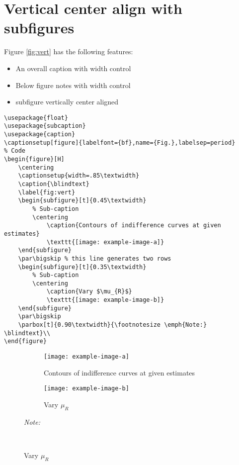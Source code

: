\documentclass[12pt,english]{article}
\begin{document}
\pagebreak


\section{Vertical center align with subfigures}

Figure \ref{fig:vert} has the following features:
\begin{itemize}
    \item An overall caption with width control
    \item Below figure notes with width control
    \item subfigure vertically center aligned
\end{itemize}

\begin{lstlisting}[frame=single]
% Included Package
\usepackage{float}
\usepackage{subcaption}
\usepackage{caption}
\captionsetup[figure]{labelfont={bf},name={Fig.},labelsep=period}
% Code
\begin{figure}[H]
    \centering
    \captionsetup{width=.85\textwidth}
	\caption{\blindtext}
	\label{fig:vert}
	\begin{subfigure}[t]{0.45\textwidth}
        % Sub-caption
        \centering
    		\caption{Contours of indifference curves at given estimates}
    		\texttt{[image: example-image-a]}
	\end{subfigure}
	\par\bigskip % this line generates two rows
	\begin{subfigure}[t]{0.35\textwidth}
	    % Sub-caption
	    \centering
    		\caption{Vary $\mu_{R}$}
    		\texttt{[image: example-image-b]}
	\end{subfigure}
	\par\bigskip
    \parbox[t]{0.90\textwidth}{\footnotesize \emph{Note:} \blindtext}\\
\end{figure}
\end{lstlisting}

\par\medskip
\begin{figure}[H]
    \centering
    \captionsetup{width=.85\textwidth}
	\caption{\blindtext}
	\label{fig:vert}
	\begin{subfigure}[t]{0.45\textwidth}
        \centering
    		\caption{Contours of indifference curves at given estimates}
    		\texttt{[image: example-image-a]}
	\end{subfigure}
	\par\bigskip %
	\begin{subfigure}[t]{0.35\textwidth}
	    \centering
    		\caption{Vary $\mu_{R}$}
    		\texttt{[image: example-image-b]}
	\end{subfigure}
	\par\bigskip
    \parbox[t]{0.90\textwidth}{\footnotesize \emph{Note:} \blindtext}\\
\end{figure}
\pagebreak
\end{document}
